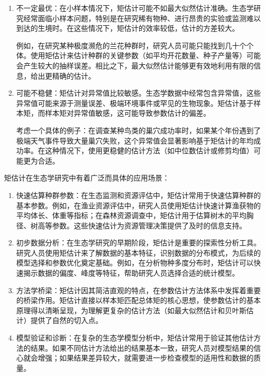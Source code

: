 \documentclass[
  twoside,12pt,fontset=none]{ctexbook}
\begin{document}
\begin{enumerate}
\def\labelenumi{\arabic{enumi}.}
\item
  不一定最优：在小样本情况下，矩估计可能不如最大似然估计准确。生态学研究经常面临小样本问题，特别是在研究稀有物种、进行昂贵的实验或监测难以到达的生境时。在这些情况下，矩估计的效率较低，估计的方差较大。

  例如，在研究某种极度濒危的兰花种群时，研究人员可能只能找到几十个个体。使用矩估计来估计种群的关键参数（如平均开花数量、种子产量等）可能会产生较大的抽样误差。相比之下，最大似然估计能够更有效地利用有限的信息，给出更精确的估计。
\item
  可能不稳健：矩估计对异常值比较敏感。生态学数据中经常包含异常值，这些异常值可能来源于测量误差、极端环境事件或罕见的生物现象。矩估计基于样本矩，而样本矩对异常值敏感，这可能导致参数估计的偏差。

  考虑一个具体的例子：在调查某种鸟类的巢穴成功率时，如果某个年份遇到了极端天气事件导致大量巢穴失败，这个异常值会显著影响基于矩估计的年均成功率。在这种情况下，使用更稳健的估计方法（如中位数估计或修剪均值）可能更为合适。
\end{enumerate}

矩估计在生态学研究中有着广泛而具体的应用场景：

\begin{enumerate}
\def\labelenumi{\arabic{enumi}.}
\item
  快速估算种群参数：在生态监测和资源评估中，矩估计常用于快速估算种群的基本参数。例如，在渔业资源评估中，研究人员使用矩估计快速计算渔获物的平均体长、体重等指标；在森林资源调查中，矩估计用于估算树木的平均胸径、树高等参数。这些快速估计为资源管理决策提供了及时的信息支持。
\item
  初步数据分析：在生态学研究的早期阶段，矩估计是重要的探索性分析工具。研究人员使用矩估计来了解数据的基本特征，识别数据的分布模式，为后续的模型选择和参数优化奠定基础。例如，在分析物种多度分布时，矩估计可以快速揭示数据的偏度、峰度等特征，帮助研究人员选择合适的统计模型。
\item
  方法学桥梁：矩估计因其简洁直观的特点，在参数估计方法体系中发挥着重要的桥梁作用。矩估计直接以样本矩匹配总体矩的核心思想，使参数估计的基本原理得以清晰呈现，为理解更复杂的估计方法（如最大似然估计和贝叶斯估计）提供了自然的切入点。
\item
  模型验证和诊断：在复杂的生态学模型分析中，矩估计常用于验证其他估计方法的结果。如果不同估计方法给出的结果基本一致，研究人员对模型结果的信心就会增强；如果结果差异较大，就需要进一步检查模型的适用性和数据的质量。
\end{enumerate}
\end{document}
